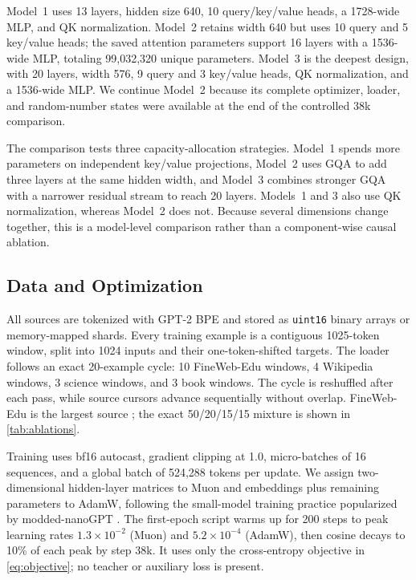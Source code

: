 \documentclass{article}
\begin{document}
Model~1 uses 13 layers, hidden size 640, 10 query/key/value heads, a
1728-wide MLP, and QK normalization. Model~2 retains width 640 but uses 10
query and 5 key/value heads; the saved attention parameters support 16 layers
with a 1536-wide MLP, totaling 99,032,320 unique parameters. Model~3 is the
deepest design, with 20 layers, width 576, 9 query and 3 key/value heads,
QK normalization, and a 1536-wide MLP. We continue Model~2 because its
complete optimizer, loader, and random-number states were available at the
end of the controlled 38k comparison.

The comparison tests three capacity-allocation strategies. Model~1 spends
more parameters on independent key/value projections, Model~2 uses GQA to
add three layers at the same hidden width, and Model~3 combines stronger GQA
with a narrower residual stream to reach 20 layers. Models~1 and 3 also use
QK normalization, whereas Model~2 does not. Because several dimensions change
together, this is a model-level comparison rather than a component-wise causal
ablation.

\subsection{Data and Optimization}

All sources are tokenized with GPT-2 BPE and stored as \texttt{uint16} binary
arrays or memory-mapped shards. Every training example is a contiguous
1025-token window, split into 1024 inputs and their one-token-shifted targets.
The loader follows an exact 20-example cycle: 10 FineWeb-Edu windows, 4
Wikipedia windows, 3 science windows, and 3 book windows. The cycle is
reshuffled after each pass, while source cursors advance sequentially without
overlap. FineWeb-Edu is the largest source \citep{penedo2024fineweb}; the exact
50/20/15/15 mixture is shown in \cref{tab:ablations}.

Training uses bf16 autocast, gradient clipping at 1.0, micro-batches of 16
sequences, and a global batch of 524,288 tokens per update. We assign
two-dimensional hidden-layer matrices to Muon and embeddings plus remaining
parameters to AdamW, following the small-model training practice popularized
by modded-nanoGPT \citep{jordan2024moddednanogpt}. The first-epoch script
warms up for 200 steps to peak learning rates
$1.3{\times}10^{-2}$ (Muon) and $5.2{\times}10^{-4}$ (AdamW), then cosine
decays to 10\% of each peak by step 38k. It uses only the cross-entropy
objective in \cref{eq:objective}; no teacher or auxiliary loss is present.
\end{document}
